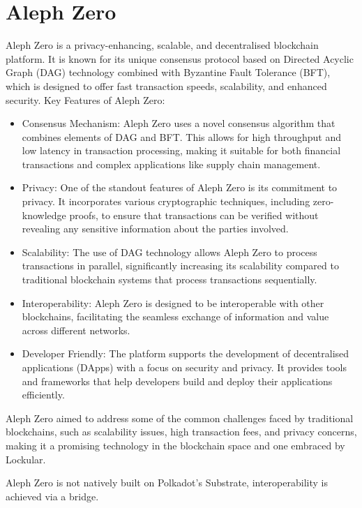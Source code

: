 \documentclass{tufte-handout}
\begin{document}
\section{Aleph Zero}\label{sec:page-layout}
Aleph Zero is a privacy-enhancing, scalable, and decentralised blockchain platform. It is known for its unique consensus protocol based on Directed Acyclic Graph (DAG) technology
combined with Byzantine Fault Tolerance (BFT), which is designed to offer fast transaction speeds, scalability, and enhanced security.
Key Features of Aleph Zero:
\begin{itemize}
\item Consensus Mechanism: Aleph Zero uses a novel consensus algorithm that combines elements of DAG and BFT. This allows for high throughput and low latency in transaction
processing, making it suitable for both financial transactions and complex applications like supply chain management.
\item Privacy: One of the standout features of Aleph Zero is its commitment to privacy. It incorporates various cryptographic techniques, including zero-knowledge proofs, to
ensure that transactions can be verified without revealing any sensitive information about the parties involved.
\item Scalability: The use of DAG technology allows Aleph Zero to process transactions in parallel, significantly increasing its scalability compared to traditional blockchain
systems that process transactions sequentially.
\item Interoperability: Aleph Zero is designed to be interoperable with other blockchains, facilitating the seamless exchange of information and value across different networks.
\item Developer Friendly: The platform supports the development of decentralised applications (DApps) with a focus on security and privacy. It provides tools and frameworks that
help developers build and deploy their applications efficiently.
\end{itemize}
Aleph Zero aimed to address some of the common challenges faced by traditional blockchains, such as scalability issues, high transaction fees, and privacy concerns, making it a
promising technology in the blockchain space and one embraced by Lockular.
 
Aleph Zero is not natively built on Polkadot's Substrate, interoperability is achieved via a bridge.
\end{document}
